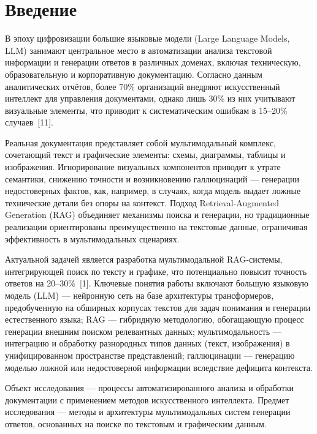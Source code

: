 \documentclass[a4paper,12pt]{article}
\begin{document}
\tableofcontents
\newpage

\newpage %
\section*{Введение}

В эпоху цифровизации большие языковые модели (Large Language Models, LLM) занимают центральное место в автоматизации анализа текстовой информации и генерации ответов в различных доменах, включая техническую, образовательную и корпоративную документацию. Согласно данным аналитических отчётов, более 70\% организаций внедряют искусственный интеллект для управления документами, однако лишь 30\% из них учитывают визуальные элементы, что приводит к систематическим ошибкам в 15--20\% случаев~[11].

Реальная документация представляет собой мультимодальный комплекс, сочетающий текст и графические элементы: схемы, диаграммы, таблицы и изображения. Игнорирование визуальных компонентов приводит к утрате семантики, снижению точности и возникновению галлюцинаций --- генерации недостоверных фактов, как, например, в случаях, когда модель выдает ложные технические детали без опоры на контекст. Подход Retrieval-Augmented Generation (RAG) объединяет механизмы поиска и генерации, но традиционные реализации ориентированы преимущественно на текстовые данные, ограничивая эффективность в мультимодальных сценариях.

Актуальной задачей является разработка мультимодальной RAG-системы, интегрирующей поиск по тексту и графике, что потенциально повысит точность ответов на 20--30\%~[1]. Ключевые понятия работы включают большую языковую модель (LLM) --- нейронную сеть на базе архитектуры трансформеров, предобученную на обширных корпусах текстов для задач понимания и генерации естественного языка; RAG --- гибридную методологию, обогащающую процесс генерации внешним поиском релевантных данных; мультимодальность --- интеграцию и обработку разнородных типов данных (текст, изображения) в унифицированном пространстве представлений; галлюцинации --- генерацию моделью ложной или недостоверной информации вследствие дефицита контекста.

Объект исследования --- процессы автоматизированного анализа и обработки документации с применением методов искусственного интеллекта. Предмет исследования --- методы и архитектуры мультимодальных систем генерации ответов, основанных на поиске по текстовым и графическим данным.
\end{document}
